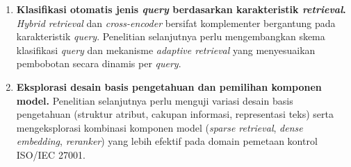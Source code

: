 \begin{enumerate}
	\item \textbf{Klasifikasi otomatis jenis \textit{query} berdasarkan karakteristik \textit{retrieval}.} \textit{Hybrid retrieval} dan \textit{cross-encoder} bersifat komplementer bergantung pada karakteristik \textit{query}. Penelitian selanjutnya perlu mengembangkan skema klasifikasi \textit{query} dan mekanisme \textit{adaptive retrieval} yang menyesuaikan pembobotan secara dinamis per \textit{query}.

	\item \textbf{Eksplorasi desain basis pengetahuan dan pemilihan komponen model.} Penelitian selanjutnya perlu menguji variasi desain basis pengetahuan (struktur atribut, cakupan informasi, representasi teks) serta mengeksplorasi kombinasi komponen model (\textit{sparse retrieval}, \textit{dense embedding}, \textit{reranker}) yang lebih efektif pada domain pemetaan kontrol ISO/IEC 27001.
\end{enumerate}
